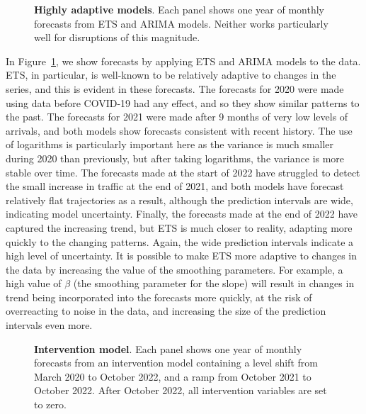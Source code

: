 \documentclass[
  11pt,
  a4paper,
]{article}
\begin{document}
\begin{figure}[!b]


\caption{\label{fig-tsol1-plot}\textbf{Highly adaptive models}. Each
panel shows one year of monthly forecasts from ETS and ARIMA models.
Neither works particularly well for disruptions of this magnitude.}

\end{figure}%

In Figure~\ref{fig-tsol1-plot}, we show forecasts by applying ETS and
ARIMA models to the data. ETS, in particular, is well-known to be
relatively adaptive to changes in the series, and this is evident in
these forecasts. The forecasts for 2020 were made using data before
COVID-19 had any effect, and so they show similar patterns to the past.
The forecasts for 2021 were made after 9 months of very low levels of
arrivals, and both models show forecasts consistent with recent history.
The use of logarithms is particularly important here as the variance is
much smaller during 2020 than previously, but after taking logarithms,
the variance is more stable over time. The forecasts made at the start
of 2022 have struggled to detect the small increase in traffic at the
end of 2021, and both models have forecast relatively flat trajectories
as a result, although the prediction intervals are wide, indicating
model uncertainty. Finally, the forecasts made at the end of 2022 have
captured the increasing trend, but ETS is much closer to reality,
adapting more quickly to the changing patterns. Again, the wide
prediction intervals indicate a high level of uncertainty. It is
possible to make ETS more adaptive to changes in the data by increasing
the value of the smoothing parameters. For example, a high value of
\(\beta\) (the smoothing parameter for the slope) will result in changes
in trend being incorporated into the forecasts more quickly, at the risk
of overreacting to noise in the data, and increasing the size of the
prediction intervals even more.

\begin{figure}[!b]


\caption{\label{fig-tsol2-plot}\textbf{Intervention model}. Each panel
shows one year of monthly forecasts from an intervention model
containing a level shift from March 2020 to October 2022, and a ramp
from October 2021 to October 2022. After October 2022, all intervention
variables are set to zero.}

\end{figure}%
\end{document}
